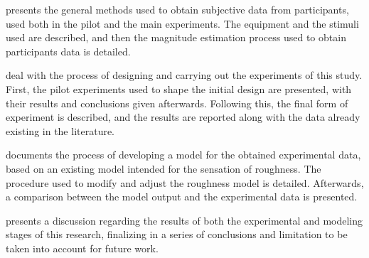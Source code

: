 \documentclass[../main.tex]{subfiles}
\begin{document}
 presents the general methods used to obtain subjective data
from participants, used both in the pilot and the main experiments. The
equipment and the stimuli used are described, and then the magnitude estimation
process used to obtain participants data is detailed.

 deal with the process of designing and carrying
out the experiments of this study. First, the pilot experiments used to shape
the initial design are presented, with their results and conclusions given
afterwards. Following this, the final form of experiment is described, and the
results are reported along with the data already existing in the literature.

 documents the process of developing a model for the obtained
experimental data, based on an existing model intended for the sensation of
roughness. The procedure used to modify and adjust the roughness model is
detailed. Afterwards, a comparison between the model output and the
experimental data is presented.

 presents a discussion regarding the results of both the
experimental and modeling stages of this research, finalizing in a series of
conclusions and limitation to be taken into account for future work.
\end{document}
